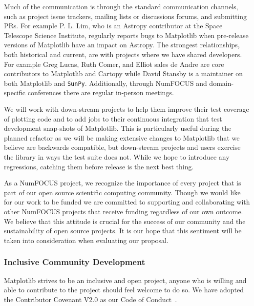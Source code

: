 \documentclass[12pt]{article}
\numberwithin{page}{section}
\begin{document}
Much of the communication is through the standard communication channels, such
as project issue trackers, mailing lists or discussions forums, and submitting
PRs.  For example P. L. Lim, who is an Astropy contributor at the Space
Telescope Science Institute, regularly reports bugs to Matplotlib when
pre-release versions of Matplotlib have an impact on Astropy.  The strongest
relationships, both historical and current, are with projects where we have
shared developers.  For example Greg Lucas, Ruth Comer, and Elliot sales de
Andre are core contributors to Matplotlib and Cartopy while David Stansby is a
maintainer on both Matplotlib and \texttt{SunPy}.  Additionally, through
NumFOCUS and domain-specific conferences there are regular in-person meetings.

We will work with down-stream projects to help them improve their test
coverage of plotting code and to add jobs to their continuous
integration that test development snap-shots of Matplotlib.  This is
particularly useful during the planned refactor as we will be making
extensive changes to Matplotlib that we believe are backwards
compatible, but down-stream projects and users exercise the library in
ways the test suite does not.  While we hope to introduce any
regressions, catching them before release is the next best thing.

As a NumFOCUS project, we recognize the importance of every project
that is part of our open source scientific computing community. Though
we would like for our work to be funded we are committed to supporting
and collaborating with other NumFOCUS projects that receive funding
regardless of our own outcome. We believe that this attitude is
crucial for the success of our community and the sustainability of
open source projects. It is our hope that this sentiment will be taken
into consideration when evaluating our proposal.


\subsubsection{Inclusive Community Development}


Matplotlib strives to be an inclusive and open project, anyone who is
willing and able to contribute to the project should feel welcome to
do so.  We have adopted the Contributor Covenant V2.0 as
our Code of Conduct~\cite{CoC}.
\end{document}
